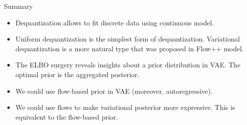 \begin{frame}{Summary}
	\begin{itemize}
		\item Dequantization allows to fit discrete data using continuous model.
		\vfill
		\item Uniform dequantization is the simplest form of dequantization. Variational dequantization is a more natural type that was proposed in Flow++ model.
		\vfill
		\item The ELBO surgery reveals insights about a prior distribution in VAE. The optimal prior is the aggregated posterior.
		\vfill
		\item We could use flow-based prior in VAE (moreover, autoregressive).
		\vfill
		\item We could use flows to make variational posterior more expressive. This is equivalent to the flow-based prior. 
	\end{itemize}
\end{frame}

 